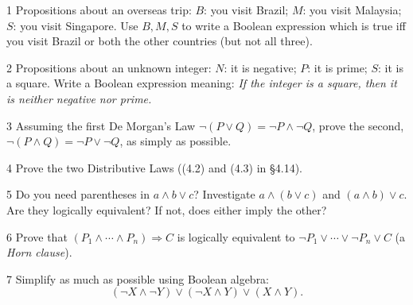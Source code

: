 
\begin{exercise}{1}
    Propositions about an overseas trip: $B$: you visit Brazil; $M$: you visit
    Malaysia; $S$: you visit Singapore. Use $B,M,S$ to write a Boolean expression
    which is true iff you visit Brazil or both the other countries (but not all
    three).
\end{exercise}

\begin{exercise}{2}
    Propositions about an unknown integer: $N$: it is negative; $P$: it is
    prime; $S$: it is a square. Write a Boolean expression meaning: \emph{If the
    integer is a square, then it is neither negative nor prime.}
\end{exercise}

\begin{exercise}{3}
    Assuming the first De Morgan's Law $\neg(P\vee Q)=\neg P\wedge\neg Q$, prove
    the second, $\neg(P\wedge Q)=\neg P\vee\neg Q$, as simply as possible.
\end{exercise}

\begin{exercise}{4}
    Prove the two Distributive Laws ((4.2) and (4.3) in \S4.14).
\end{exercise}

\begin{exercise}{5}
    Do you need parentheses in $a\wedge b\vee c$? Investigate
    $a\wedge(b\vee c)$ and $(a\wedge b)\vee c$. Are they logically equivalent? If
    not, does either imply the other?
\end{exercise}

\begin{exercise}{6}
    Prove that $(P_1\wedge\cdots\wedge P_n)\Rightarrow C$ is logically equivalent
    to $\neg P_1\vee\cdots\vee\neg P_n\vee C$ (a \emph{Horn clause}).
\end{exercise}

\begin{exercise}{7}
    Simplify as much as possible using Boolean algebra:
    \[
        (\neg X\wedge\neg Y)\vee(\neg X\wedge Y)\vee(X\wedge Y).
    \]
\end{exercise}

